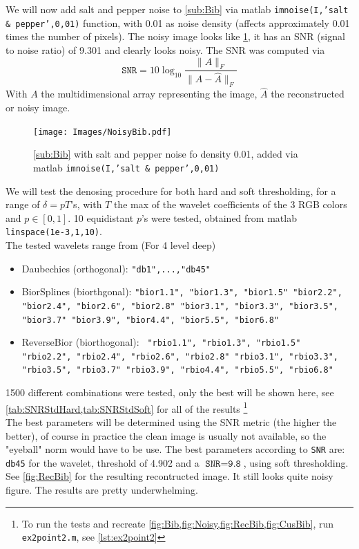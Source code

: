 \documentclass[a4paper]{article}
\begin{document}
	We will now add salt and pepper noise to \cref{sub:Bib} via matlab \texttt{imnoise(I,'salt \& pepper',0,01)} function, with 0.01 as noise density (affects approximately 0.01 times the number of pixels). The noisy image looks like \cref{fig:Noisy}, it has an SNR (signal to noise ratio) of 9.301 and clearly looks noisy. The SNR was computed via
	\begin{equation} \label{eq:SNR}
		\texttt{SNR} = 10 \log_{10}{\frac{\|A\|_F}{\|A-\hat{A}\|_F}}
	\end{equation}
	With $A$ the multidimensional array representing the image, $\hat{A}$ the reconstructed or noisy image.
    \begin{figure}[H]
	\centering
	\texttt{[image: Images/NoisyBib.pdf]}
	\caption{\cref{sub:Bib} with salt and pepper noise fo density 0.01, added via matlab \texttt{imnoise(I,'salt \& pepper',0,01)}}
	\label{fig:Noisy}
\end{figure}

	We will test the denosing procedure for both hard and soft thresholding, for a range of $\delta = p T$'s, with $T$ the max of the wavelet coefficients of the 3 RGB colors and $p \in [0,1]$. 10 equidistant $p$'s were tested, obtained from matlab \texttt{linspace(\texttt{1e-3},1,10)}. \\
	The tested wavelets range from (For 4 level deep)
	\begin{itemize}
		\item Daubechies (orthogonal): \texttt{"db1",...,"db45"}
		\item BiorSplines (biorthgonal): \texttt{"bior1.1", "bior1.3", "bior1.5"
			"bior2.2", "bior2.4", "bior2.6", "bior2.8"
			"bior3.1", "bior3.3", "bior3.5", "bior3.7"
			"bior3.9", "bior4.4", "bior5.5", "bior6.8"}	
		\item ReverseBior (biorthogonal): \texttt{	"rbio1.1", "rbio1.3", "rbio1.5"
			"rbio2.2", "rbio2.4", "rbio2.6", "rbio2.8"	
			"rbio3.1", "rbio3.3", "rbio3.5", "rbio3.7"
			"rbio3.9", "rbio4.4", "rbio5.5", "rbio6.8"}
	\end{itemize}
	1500 different combinations were tested, only the best will be shown here, see \cref{tab:SNRStdHard,tab:SNRStdSoft} for all of the results \footnote{To run the tests and recreate \cref{fig:Bib,fig:Noisy,fig:RecBib,fig:CusBib}, run \texttt{ex2point2.m}, see \cref{lst:ex2point2}} \\
	
	The best parameters will be determined using the SNR metric (the higher the better), of course in practice the clean image is usually not available, so the "eyeball" norm would have to be use. The best parameters according to \texttt{SNR} are: \texttt{db45} for the wavelet, threshold of 4.902 and a $\texttt{SNR} = \texttt{9.8}$, using soft thresholding. See \cref{fig:RecBib} for the resulting recontructed image. It still looks quite noisy figure. The results are pretty underwhelming.
\end{document}
